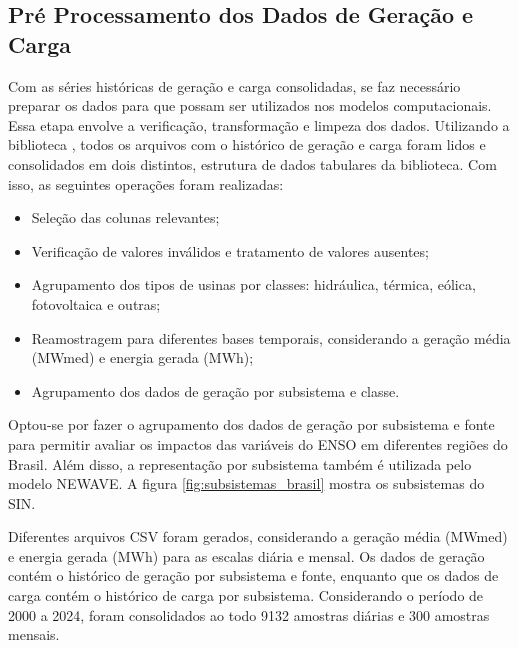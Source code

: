 \subsection{Pré Processamento dos Dados de Geração e Carga} %
Com as séries históricas de geração e carga consolidadas, se faz necessário preparar os dados para que possam ser utilizados 
nos modelos computacionais. Essa etapa envolve a verificação, transformação e limpeza dos dados. Utilizando a biblioteca
, todos os arquivos com o histórico de geração e carga foram lidos e consolidados em dois  
distintos, estrutura de dados tabulares da biblioteca. Com isso, as seguintes operações foram realizadas:
\begin{itemize}
    \item Seleção das colunas relevantes;
    \item Verificação de valores inválidos e tratamento de valores ausentes;
    \item Agrupamento dos tipos de usinas por classes: hidráulica, térmica, eólica, fotovoltaica e outras;
    \item Reamostragem para diferentes bases temporais, considerando a geração média (MWmed) e energia gerada (MWh);
    \item Agrupamento dos dados de geração por subsistema e classe.
\end{itemize}

\begin{figure}[!ht]
	{}
	{}
\end{figure}

Optou-se por fazer o agrupamento dos dados de geração por subsistema e fonte para permitir avaliar os impactos das variáveis
do ENSO em diferentes regiões do Brasil. Além disso, a representação por subsistema também é utilizada pelo modelo NEWAVE. 
A figura \ref{fig:subsistemas_brasil} mostra os subsistemas do SIN.

Diferentes arquivos CSV foram gerados, considerando a geração média (MWmed) e energia gerada (MWh) para as escalas diária e mensal.
Os dados de geração contém o histórico de geração por subsistema e fonte, enquanto que os dados de carga contém o histórico de carga
por subsistema. Considerando o período de 2000 a 2024, foram consolidados ao todo 9132 amostras diárias e 300 amostras mensais.

